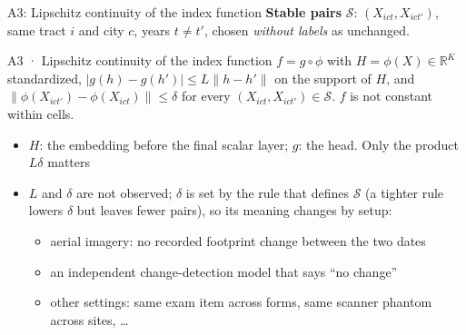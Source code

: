 \documentclass[10pt,aspectratio=169]{beamer}
\newcommand{\R}{\mathbb{R}}
\newcommand{\Sset}{\mathcal{S}}
\begin{document}
\begin{frame}{A3: Lipschitz continuity of the index function}
\footnotesize \textbf{Stable pairs} $\Sset$: $(X_{ict},X_{ict'})$, same tract $i$ and city $c$, years $t\neq t'$, chosen \emph{without labels} as unchanged.
\begin{tbox}[blue]{A3 · Lipschitz continuity of the index function}
\small $f=g\circ\phi$ with $H=\phi(X)\in\R^K$ standardized, $|g(h)-g(h')|\le L\|h-h'\|$ on the support of $H$, and $\|\phi(X_{ict'})-\phi(X_{ict})\|\le\delta$ for every $(X_{ict},X_{ict'})\in\Sset$. $f$ is not constant within cells.
\end{tbox}
\begin{itemize}\footnotesize
  \item $H$: the embedding before the final scalar layer; $g$: the head. Only the product $L\delta$ matters
  \item $L$ and $\delta$ are not observed; $\delta$ is set by the rule that defines $\Sset$ (a tighter rule lowers $\delta$ but leaves fewer pairs), so its meaning changes by setup:
  \begin{itemize}\scriptsize
    \item aerial imagery: no recorded footprint change between the two dates
    \item an independent change-detection model that says ``no change''
    \item other settings: same exam item across forms, same scanner phantom across sites, \dots
  \end{itemize}
\end{itemize}
\end{frame}
\end{document}

